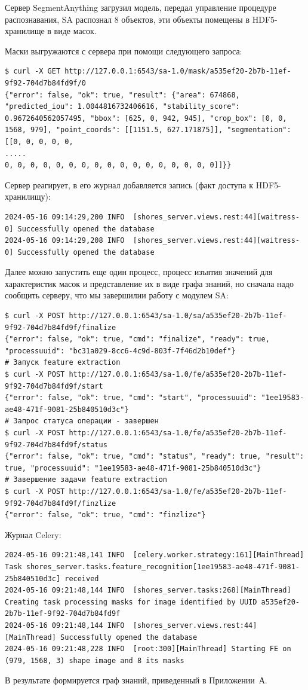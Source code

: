 \documentclass[732,fontsize=14pt,final]{studrep}
\begin{document}
Сервер SegmentAnything загрузил модель, передал управление процедуре распознавания, SA распознал 8 объектов, эти объекты помещены в HDF5-хранилище в виде масок.

Маски выгружаются с сервера при помощи следующего запроса:
\begin{verbatim}
$ curl -X GET http://127.0.0.1:6543/sa-1.0/mask/a535ef20-2b7b-11ef-9f92-704d7b84fd9f/0
{"error": false, "ok": true, "result": {"area": 674868, "predicted_iou": 1.0044816732406616, "stability_score": 0.9672640562057495, "bbox": [625, 0, 942, 945], "crop_box": [0, 0, 1568, 979], "point_coords": [[1151.5, 627.171875]], "segmentation": [[0, 0, 0, 0, 0, 
.....
0, 0, 0, 0, 0, 0, 0, 0, 0, 0, 0, 0, 0, 0, 0, 0, 0]]}}
\end{verbatim}

Сервер реагирует, в его журнал добавляется запись (факт доступа к HDF5-хранилищу):
\begin{verbatim}
2024-05-16 09:14:29,200 INFO  [shores_server.views.rest:44][waitress-0] Successfully opened the database
2024-05-16 09:14:29,208 INFO  [shores_server.views.rest:44][waitress-0] Successfully opened the database 
\end{verbatim}

Далее можно запустить еще один процесс, процесс изъятия значений для характеристик масок и представление их в виде графа знаний, но сначала надо сообщить серверу, что мы завершилии работу с модулем SA:
\begin{verbatim}
$ curl -X POST http://127.0.0.1:6543/sa-1.0/sa/a535ef20-2b7b-11ef-9f92-704d7b84fd9f/finalize
{"error": false, "ok": true, "cmd": "finalize", "ready": true, "processuuid": "bc31a029-8cc6-4c9d-803f-7f46d2b10def"}
# Запуск feature extraction
$ curl -X POST http://127.0.0.1:6543/sa-1.0/fe/a535ef20-2b7b-11ef-9f92-704d7b84fd9f/start
{"error": false, "ok": true, "cmd": "start", "processuuid": "1ee19583-ae48-471f-9081-25b840510d3c"}
# Запрос статуса операции - завершен
$ curl -X POST http://127.0.0.1:6543/sa-1.0/fe/a535ef20-2b7b-11ef-9f92-704d7b84fd9f/status
{"error": false, "ok": true, "cmd": "status", "ready": true, "result": true, "processuuid": "1ee19583-ae48-471f-9081-25b840510d3c"}
# Завершение задачи feature extraction
$ curl -X POST http://127.0.0.1:6543/sa-1.0/fe/a535ef20-2b7b-11ef-9f92-704d7b84fd9f/finzlize
{"error": false, "ok": true, "cmd": "finzlize"}
\end{verbatim}

Журнал Celery:
\begin{verbatim}
2024-05-16 09:21:48,141 INFO  [celery.worker.strategy:161][MainThread] Task shores_server.tasks.feature_recognition[1ee19583-ae48-471f-9081-25b840510d3c] received
2024-05-16 09:21:48,144 INFO  [shores_server.tasks:268][MainThread] Creating task processing masks for image identified by UUID a535ef20-2b7b-11ef-9f92-704d7b84fd9f
2024-05-16 09:21:48,144 INFO  [shores_server.views.rest:44][MainThread] Successfully opened the database
2024-05-16 09:21:48,228 INFO  [root:300][MainThread] Starting FE on (979, 1568, 3) shape image and 8 its masks
\end{verbatim}
В результате формируется граф знаний, приведенный в Приложении~А.
\end{document}
